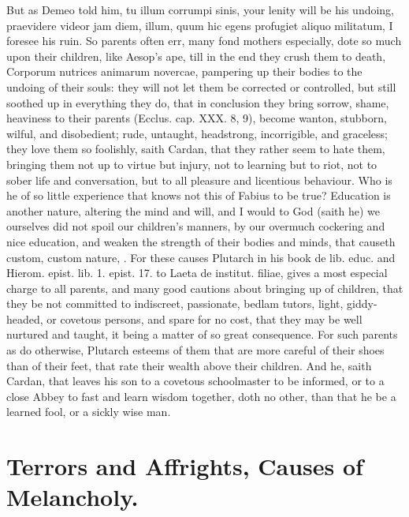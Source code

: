 {But as Demeo told him, tu illum corrumpi sinis, your lenity will be his
undoing, praevidere videor jam diem, illum, quum hic egens profugiet
aliquo militatum, I foresee his ruin. So parents often err, many fond
mothers especially, dote so much upon their children, like
Aesop's ape, till in the end they crush them to death, Corporum
nutrices animarum novercae, pampering up their bodies to the undoing of
their souls: they will not let them be corrected or controlled,
but still soothed up in everything they do, that in conclusion they
bring sorrow, shame, heaviness to their parents (Ecclus. cap. XXX. 8,
9), become wanton, stubborn, wilful, and disobedient; rude, untaught,
headstrong, incorrigible, and graceless; they love them so foolishly,
saith Cardan, that they rather seem to hate them, bringing them
not up to virtue but injury, not to learning but to riot, not to sober
life and conversation, but to all pleasure and licentious behaviour.
Who is he of so little experience that knows not this of Fabius to be
true? Education is another nature, altering the mind and will,
and I would to God (saith he) we ourselves did not spoil our children's
manners, by our overmuch cockering and nice education, and weaken the
strength of their bodies and minds, that causeth custom, custom nature,
\etc{}. For these causes Plutarch in his book de lib. educ. and Hierom.
epist. lib. 1. epist. 17. to Laeta de institut. filiae, gives a most
especial charge to all parents, and many good cautions about bringing
up of children, that they be not committed to indiscreet, passionate,
bedlam tutors, light, giddy-headed, or covetous persons, and spare for
no cost, that they may be well nurtured and taught, it being a matter
of so great consequence. For such parents as do otherwise, Plutarch
esteems of them that are more careful of their shoes than of
their feet, that rate their wealth above their children. And he, saith
Cardan, that leaves his son to a covetous schoolmaster to be
informed, or to a close Abbey to fast and learn wisdom together, doth
no other, than that he be a learned fool, or a sickly wise man.

\section{Terrors and Affrights, Causes of Melancholy.}

}
